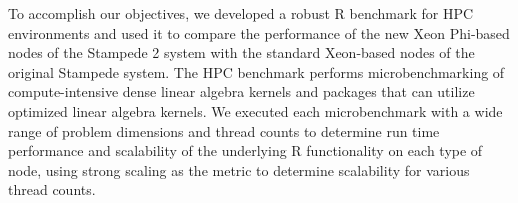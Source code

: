 To accomplish our objectives, we developed a robust R benchmark for HPC
  environments and used it to compare the performance of the new Xeon Phi-based
  nodes of the Stampede 2 system with the standard Xeon-based nodes of the
  original Stampede system.
The HPC benchmark performs microbenchmarking of compute-intensive dense linear
  algebra kernels and packages that can utilize optimized linear algebra
  kernels.
We executed each microbenchmark with a wide range of problem dimensions and
  thread counts to determine run time performance and scalability of the
  underlying R functionality on each type of node, using strong scaling as the
  metric to determine scalability for various thread counts.
